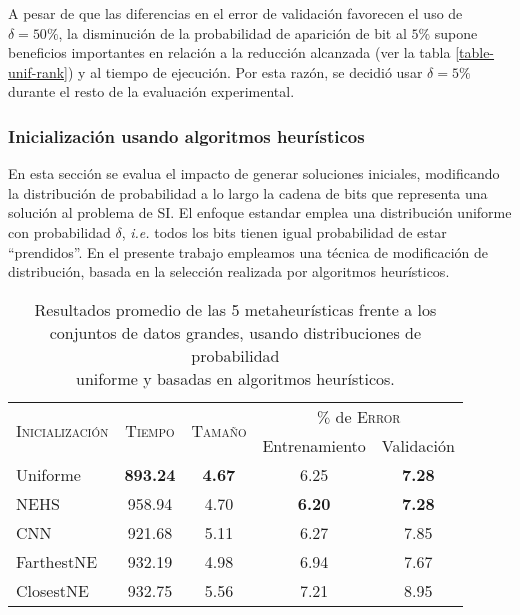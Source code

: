 A pesar de que las diferencias en el error de validación favorecen el uso de\linebreak$\delta = 50\%$, la disminución de la probabilidad de aparición de bit al $5\%$ supone beneficios importantes en relación a la reducción alcanzada (ver la tabla \ref{table-unif-rank}) y al tiempo de ejecución. Por esta razón, se decidió usar $\delta = 5\%$ durante el resto de la evaluación experimental.

\subsubsection{Inicialización usando algoritmos heurísticos}

En esta sección se evalua el impacto de generar soluciones iniciales, modificando la distribución de probabilidad a lo largo la cadena de bits que representa una solución al problema de SI. El enfoque estandar emplea una distribución uniforme con probabilidad $\delta$, \emph{i.e.} todos los bits tienen igual probabilidad de estar ``prendidos''. En el presente trabajo empleamos una técnica de modificación de distribución, basada en la selección realizada por algoritmos heurísticos.

\begin{table}[h!]
\centering
\begin{tabular}{l c c c c}
\hline
\multirow{2}{*}{\textsc{Inicialización}}
	& \multirow{2}{*}{\textsc{Tiempo}}
	& \multirow{2}{*}{\textsc{Tamaño}}
	& \multicolumn{2}{c}{$\%$ de \textsc{Error}} \\\cline{4-5}
 & & & \scriptsize{Entrenamiento} & \scriptsize{Validación} \\
\hline
\hline
Uniforme   & \textbf{893.24} & \textbf{4.67} & 6.25 & \textbf{7.28} \\
NEHS       & 958.94 & 4.70 & \textbf{6.20} & \textbf{7.28} \\
CNN        & 921.68 & 5.11 & 6.27 & 7.85 \\
FarthestNE & 932.19 & 4.98 & 6.94 & 7.67 \\
ClosestNE  & 932.75 & 5.56 & 7.21 & 8.95 \\
\hline
\end{tabular}
\caption[Resultados usando distribuciones uniforme y heurísticas]{Resultados promedio de las 5 metaheurísticas frente a los\\conjuntos de datos grandes, usando distribuciones de probabilidad\\uniforme y basadas en algoritmos heurísticos.}
\label{table-inits}
\end{table}

